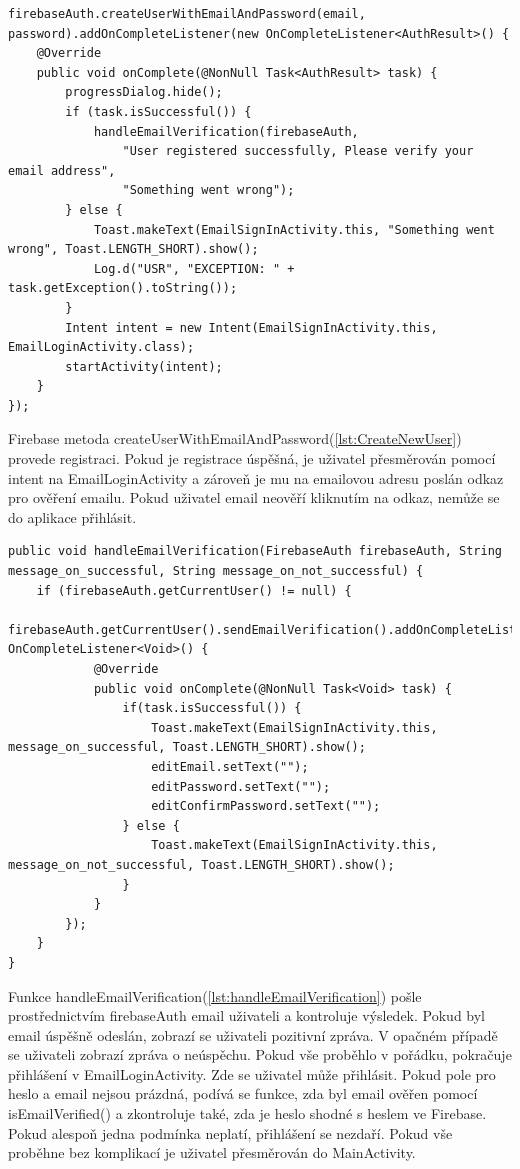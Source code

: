 \begin{lstlisting}[style=javastyle,caption = {Create New User},label = {lst:CreateNewUser}]
firebaseAuth.createUserWithEmailAndPassword(email, password).addOnCompleteListener(new OnCompleteListener<AuthResult>() {
    @Override
    public void onComplete(@NonNull Task<AuthResult> task) {
        progressDialog.hide();
        if (task.isSuccessful()) {
            handleEmailVerification(firebaseAuth, 
                "User registered successfully, Please verify your email address", 
                "Something went wrong");
        } else {
            Toast.makeText(EmailSignInActivity.this, "Something went wrong", Toast.LENGTH_SHORT).show();
            Log.d("USR", "EXCEPTION: " + task.getException().toString());
        }
        Intent intent = new Intent(EmailSignInActivity.this, EmailLoginActivity.class);
        startActivity(intent);
    }
});
\end{lstlisting} 

Firebase metoda createUserWithEmailAndPassword(\autoref{lst:CreateNewUser}) provede registraci. Pokud je registrace úspěšná, je uživatel přesměrován pomocí intent na EmailLoginActivity a zároveň je mu na emailovou adresu poslán odkaz pro ověření emailu. Pokud uživatel email neověří kliknutím na odkaz, nemůže se do aplikace přihlásit.

\begin{lstlisting}[style=javastyle,caption = {handleEmailVerification},label = {lst:handleEmailVerification}]
public void handleEmailVerification(FirebaseAuth firebaseAuth, String message_on_successful, String message_on_not_successful) {
    if (firebaseAuth.getCurrentUser() != null) {
        firebaseAuth.getCurrentUser().sendEmailVerification().addOnCompleteListener(new OnCompleteListener<Void>() {
            @Override
            public void onComplete(@NonNull Task<Void> task) {
                if(task.isSuccessful()) {
                    Toast.makeText(EmailSignInActivity.this, message_on_successful, Toast.LENGTH_SHORT).show();
                    editEmail.setText("");
                    editPassword.setText("");
                    editConfirmPassword.setText("");
                } else {
                    Toast.makeText(EmailSignInActivity.this, message_on_not_successful, Toast.LENGTH_SHORT).show();
                }
            }
        });
    }
}

\end{lstlisting}    

Funkce handleEmailVerification(\autoref{lst:handleEmailVerification}) pošle prostřednictvím firebaseAuth email uživateli a kontroluje výsledek. Pokud byl email úspěšně odeslán, zobrazí se uživateli pozitivní zpráva. V opačném případě se uživateli zobrazí zpráva o neúspěchu. Pokud vše proběhlo v pořádku, pokračuje přihlášení v EmailLoginActivity. Zde se uživatel může přihlásit. Pokud pole pro heslo a email nejsou prázdná, podívá se funkce, zda byl email ověřen pomocí isEmailVerified() a zkontroluje také, zda je heslo shodné s heslem ve Firebase. Pokud alespoň jedna podmínka neplatí, přihlášení se nezdaří. Pokud vše proběhne bez komplikací je uživatel přesměrován do MainActivity. \newpage

